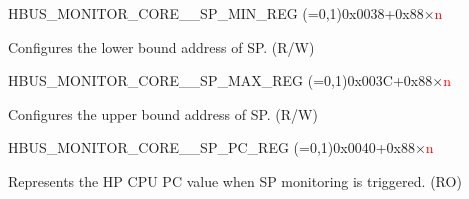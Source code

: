 \begin{register}{H}{BUS\_MONITOR\_CORE\_\_SP\_MIN\_REG (=0,1)}{0x0038+0x88×\textcolor{red}{n}}\label{regdesc:BUSMONITORCORE0SPMINREG}
%
\regnewline%
\begin{regdesc}\begin{reglist}
\label{fielddesc:BUSMONITORCORE0SPMIN}\item [BUS\_MONITOR\_CORE\_\regindex{n}\_SP\_MIN] Configures the lower bound address of SP. (R/W)
\end{reglist}\end{regdesc}
\end{register}


\begin{register}{H}{BUS\_MONITOR\_CORE\_\_SP\_MAX\_REG (=0,1)}{0x003C+0x88×\textcolor{red}{n}}\label{regdesc:BUSMONITORCORE0SPMAXREG}
%
\regnewline%
\begin{regdesc}\begin{reglist}
\label{fielddesc:BUSMONITORCORE0SPMAX}\item [BUS\_MONITOR\_CORE\_\regindex{n}\_SP\_MAX] Configures the upper bound address of SP. (R/W)
\end{reglist}\end{regdesc}
\end{register}


\begin{register}{H}{BUS\_MONITOR\_CORE\_\_SP\_PC\_REG (=0,1)}{0x0040+0x88×\textcolor{red}{n}}\label{regdesc:BUSMONITORCORE0SPPCREG}
%
\regnewline%
\begin{regdesc}\begin{reglist}
\label{fielddesc:BUSMONITORCORE0SPPC}\item [BUS\_MONITOR\_CORE\_\regindex{n}\_SP\_PC] Represents the HP CPU PC value when SP monitoring is triggered. (RO)
\end{reglist}\end{regdesc}
\end{register}


